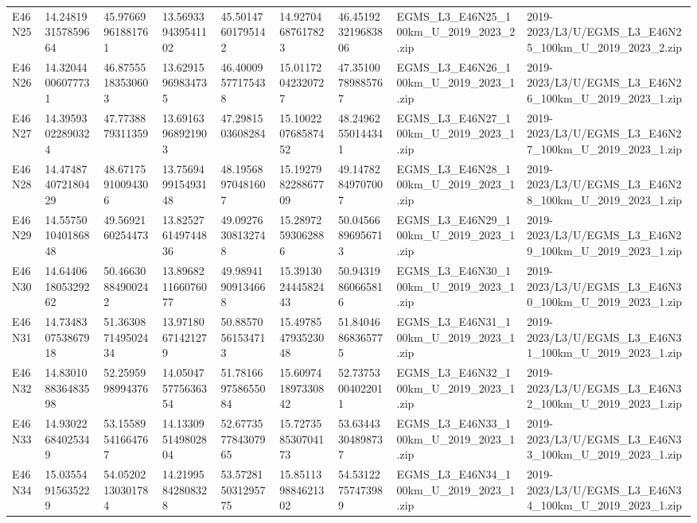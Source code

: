 \begin{landscape}
\begin{longtable}{lllllllll}
E46N25 & 14.248193157859664 & 45.97669961881761 & 13.569339439541102 & 45.50147601795142 & 14.92704687617823 & 46.451923219683806 & EGMS\_L3\_E46N25\_100km\_U\_2019\_2023\_2.zip & 2019-2023/L3/U/EGMS\_L3\_E46N25\_100km\_U\_2019\_2023\_2.zip \\
E46N26 & 14.32044006077731 & 46.87555183530603 & 13.62915969834735 & 46.40009577175438 & 15.01172042320727 & 47.35100789885767 & EGMS\_L3\_E46N26\_100km\_U\_2019\_2023\_1.zip & 2019-2023/L3/U/EGMS\_L3\_E46N26\_100km\_U\_2019\_2023\_1.zip \\
E46N27 & 14.39593022890324 & 47.7738879311359 & 13.69163968921903 & 47.2981503608284 & 15.100220768587452 & 48.24962550144341 & EGMS\_L3\_E46N27\_100km\_U\_2019\_2023\_1.zip & 2019-2023/L3/U/EGMS\_L3\_E46N27\_100km\_U\_2019\_2023\_1.zip \\
E46N28 & 14.474874072180429 & 48.67175910094306 & 13.756949915493148 & 48.19568970481607 & 15.192798228867709 & 49.14782849707007 & EGMS\_L3\_E46N28\_100km\_U\_2019\_2023\_1.zip & 2019-2023/L3/U/EGMS\_L3\_E46N28\_100km\_U\_2019\_2023\_1.zip \\
E46N29 & 14.557501040186848 & 49.5692160254473 & 13.825276149744836 & 49.09276308132748 & 15.28972593062886 & 50.04566896956713 & EGMS\_L3\_E46N29\_100km\_U\_2019\_2023\_1.zip & 2019-2023/L3/U/EGMS\_L3\_E46N29\_100km\_U\_2019\_2023\_1.zip \\
E46N30 & 14.644061805329262 & 50.46630884900242 & 13.896821166076077 & 49.98941909134668 & 15.391302444582443 & 50.94319860665816 & EGMS\_L3\_E46N30\_100km\_U\_2019\_2023\_1.zip & 2019-2023/L3/U/EGMS\_L3\_E46N30\_100km\_U\_2019\_2023\_1.zip \\
E46N31 & 14.734830753867918 & 51.363087149502434 & 13.97180671421279 & 50.88570561534713 & 15.497854793523048 & 51.84046868365775 & EGMS\_L3\_E46N31\_100km\_U\_2019\_2023\_1.zip & 2019-2023/L3/U/EGMS\_L3\_E46N31\_100km\_U\_2019\_2023\_1.zip \\
E46N32 & 14.830108836483598 & 52.2595998994376 & 14.050475775636354 & 51.781669758655084 & 15.609741897330842 & 52.73753004022011 & EGMS\_L3\_E46N32\_100km\_U\_2019\_2023\_1.zip & 2019-2023/L3/U/EGMS\_L3\_E46N32\_100km\_U\_2019\_2023\_1.zip \\
E46N33 & 14.93022684025349 & 53.15589541664767 & 14.133095149802804 & 52.677357784307965 & 15.727358530704173 & 53.63443304898737 & EGMS\_L3\_E46N33\_100km\_U\_2019\_2023\_1.zip & 2019-2023/L3/U/EGMS\_L3\_E46N33\_100km\_U\_2019\_2023\_1.zip \\
E46N34 & 15.03554915635229 & 54.05202130301784 & 14.21995842808328 & 53.572815031295775 & 15.851139884621302 & 54.53122757473989 & EGMS\_L3\_E46N34\_100km\_U\_2019\_2023\_1.zip & 2019-2023/L3/U/EGMS\_L3\_E46N34\_100km\_U\_2019\_2023\_1.zip \\

\end{longtable}
\end{landscape}
